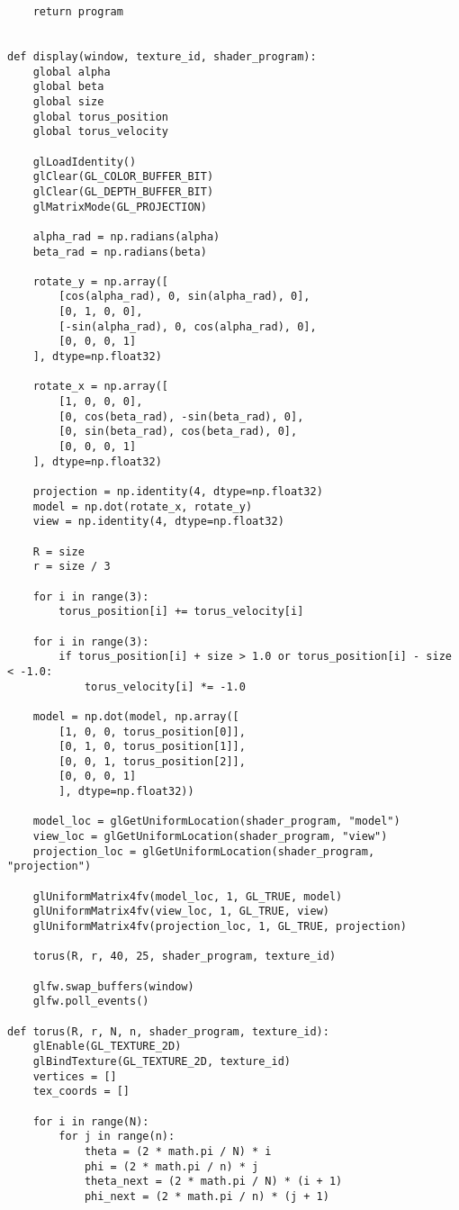 \documentclass[a4paper, 14pt]{extarticle}
\begin{document}
\begin{lstlisting}
    return program


def display(window, texture_id, shader_program):
    global alpha
    global beta
    global size
    global torus_position
    global torus_velocity

    glLoadIdentity()
    glClear(GL_COLOR_BUFFER_BIT)
    glClear(GL_DEPTH_BUFFER_BIT)
    glMatrixMode(GL_PROJECTION)

    alpha_rad = np.radians(alpha)
    beta_rad = np.radians(beta)

    rotate_y = np.array([
        [cos(alpha_rad), 0, sin(alpha_rad), 0],
        [0, 1, 0, 0],
        [-sin(alpha_rad), 0, cos(alpha_rad), 0],
        [0, 0, 0, 1]
    ], dtype=np.float32)

    rotate_x = np.array([
        [1, 0, 0, 0],
        [0, cos(beta_rad), -sin(beta_rad), 0],
        [0, sin(beta_rad), cos(beta_rad), 0],
        [0, 0, 0, 1]
    ], dtype=np.float32)

    projection = np.identity(4, dtype=np.float32)
    model = np.dot(rotate_x, rotate_y)
    view = np.identity(4, dtype=np.float32)

    R = size
    r = size / 3

    for i in range(3):
        torus_position[i] += torus_velocity[i]

    for i in range(3):
        if torus_position[i] + size > 1.0 or torus_position[i] - size < -1.0:
            torus_velocity[i] *= -1.0

    model = np.dot(model, np.array([
        [1, 0, 0, torus_position[0]],
        [0, 1, 0, torus_position[1]],
        [0, 0, 1, torus_position[2]],
        [0, 0, 0, 1]
        ], dtype=np.float32))

    model_loc = glGetUniformLocation(shader_program, "model")
    view_loc = glGetUniformLocation(shader_program, "view")
    projection_loc = glGetUniformLocation(shader_program, "projection")

    glUniformMatrix4fv(model_loc, 1, GL_TRUE, model)
    glUniformMatrix4fv(view_loc, 1, GL_TRUE, view)
    glUniformMatrix4fv(projection_loc, 1, GL_TRUE, projection)

    torus(R, r, 40, 25, shader_program, texture_id)

    glfw.swap_buffers(window)
    glfw.poll_events()

def torus(R, r, N, n, shader_program, texture_id):
    glEnable(GL_TEXTURE_2D)
    glBindTexture(GL_TEXTURE_2D, texture_id)
    vertices = []
    tex_coords = []

    for i in range(N):
        for j in range(n):
            theta = (2 * math.pi / N) * i
            phi = (2 * math.pi / n) * j
            theta_next = (2 * math.pi / N) * (i + 1)
            phi_next = (2 * math.pi / n) * (j + 1)


\end{lstlisting}
\end{document}
